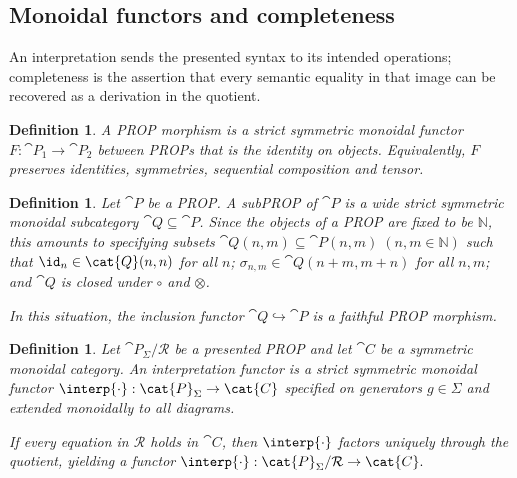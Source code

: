 \documentclass[10pt,a4paper]{article}
\newtheorem{definition}[theorem]{Definition}
\newtheorem{remark}[theorem]{Remark}
\begin{document}

\subsection{Monoidal functors and completeness}

An interpretation sends the presented syntax to its intended operations; completeness is the
assertion that every semantic equality in that image can be recovered as a derivation in the
quotient.

\begin{definition}\label{def:prop-morphism}
A \emph{PROP morphism} is a strict symmetric monoidal functor
\(F:\cat{P}_1\to\cat{P}_2\) between PROPs that is the identity on objects.
Equivalently, \(F\) preserves identities, symmetries, sequential composition and
tensor.
\end{definition}

\begin{definition}\label{def:subprop}
Let \(\cat{P}\) be a PROP.
A \emph{subPROP} of \(\cat{P}\) is a wide strict symmetric monoidal subcategory
\(\cat{Q}\subseteq\cat{P}\).
Since the objects of a PROP are fixed to be \(\mathbb{N}\), this amounts to specifying
subsets
\(
  \cat{Q}(n,m)\subseteq \cat{P}(n,m)\;(n,m\in\mathbb{N})
\)
such that \(\id_n\in \cat{Q}(n,n)\) for all \(n\); \(\sigma_{n,m}\in \cat{Q}(n+m,m+n)\) for all \(n,m\); and
\(\cat{Q}\) is closed under \(\circ\) and \(\otimes\).

In this situation, the inclusion functor \(\cat{Q}\hookrightarrow \cat{P}\) is a faithful PROP morphism.
\end{definition}

\begin{definition}\label{def:interpretation-functor}
Let \(\cat{P}_\Sigma/\mathcal{R}\) be a presented PROP and let \(\cat{C}\) be a
symmetric monoidal category. An \emph{interpretation functor} is a strict
symmetric monoidal functor
\(
  \interp{\cdot}:\cat{P}_\Sigma\to\cat{C}
\)
specified on generators \(g\in\Sigma\) and extended monoidally to all diagrams.

If every equation in \(\mathcal{R}\) holds in \(\cat{C}\), then
\(\interp{\cdot}\) factors uniquely through the quotient, yielding a functor
\(
  \interp{\cdot}:\cat{P}_\Sigma/\mathcal{R}\to\cat{C}.
\)
\end{definition}
\end{document}
